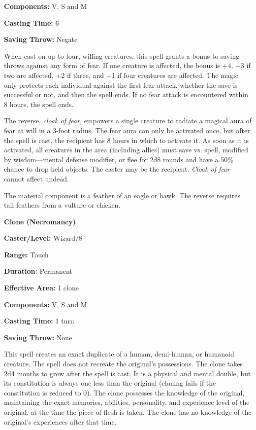 \begin{multicols}{2}
\begin{minipage}{\columnwidth}
\noindent \textbf{Components:} V, S and M

\noindent \textbf{Casting Time:} 6

\noindent \textbf{Saving Throw:} Negate

\end{minipage}

When cast on up to four, willing creatures, this spell grants a bonus to saving throws against any form of fear.  If one creature is affected, the bonus is +4, +3 if two are affected, +2 if three, and +1 if four creatures are affected.  The magic only protects each individual against the first fear attack, whether the save is successful or not, and then the spell ends.  If no fear attack is encountered within 8 hours, the spell ends.

The reverse, \textit{cloak of fear}, empowers a single creature to radiate a magical aura of fear at will in a 3-foot radius.  The fear aura can only be activated once, but after the spell is cast, the recipient has 8 hours in which to activate it.  As soon as it is activated, all creatures in the area (including allies) must save vs. spell, modified by wisdom---mental defense modifier, or flee for 2d8 rounds and have a 50\% chance to drop held objects.  The caster may be the recipient.  \textit{Cloak of fear} cannot affect undead.

The material component is a feather of an eagle or hawk.  The reverse requires tail feathers from a vulture or chicken. 

\vspace{1em}

\noindent
\begin{minipage}{\columnwidth}

\noindent \textbf{Clone (Necromancy)}

\noindent \textbf{Caster/Level:} Wizard/8

\noindent \textbf{Range:} Touch

\noindent \textbf{Duration:} Permanent

\noindent \textbf{Effective Area:} 1 clone

\noindent \textbf{Components:} V, S and M

\noindent \textbf{Casting Time:} 1 turn

\noindent \textbf{Saving Throw:} None

\end{minipage}

This spell creates an exact duplicate of a human, demi-human, or humanoid creature.  The spell does not recreate the original's possessions.  The clone takes 2d4 months to grow after the spell is cast.  It is a physical and mental double, but its constitution is always one less than the original (cloning fails if the constitution is reduced to 0).  The clone possesses the knowledge of the original, maintaining the exact memories, abilities, personality, and experience level of the original, at the time the piece of flesh is taken.  The clone has no knowledge of the original's experiences after that time. 


\end{multicols}
